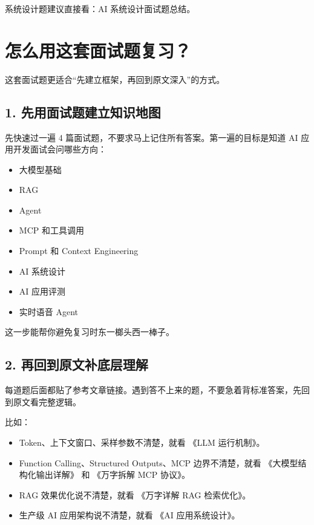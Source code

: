 \documentclass[9pt,a4paper,twocolumn]{ctexart}
\begin{document}
系统设计题建议直接看：AI 系统设计面试题总结。



\section*{怎么用这套面试题复习？}


这套面试题更适合“先建立框架，再回到原文深入”的方式。



\subsection*{1. 先用面试题建立知识地图}


先快速过一遍 4 篇面试题，不要求马上记住所有答案。第一遍的目标是知道 AI 应用开发面试会问哪些方向：


\begin{itemize}[itemsep=1pt, topsep=2pt]
  \item 大模型基础
  \item RAG
  \item Agent
  \item MCP 和工具调用
  \item Prompt 和 Context Engineering
  \item AI 系统设计
  \item AI 应用评测
  \item 实时语音 Agent
\end{itemize}


这一步能帮你避免复习时东一榔头西一棒子。



\subsection*{2. 再回到原文补底层理解}


每道题后面都贴了参考文章链接。遇到答不上来的题，不要急着背标准答案，先回到原文看完整逻辑。



比如：


\begin{itemize}[itemsep=1pt, topsep=2pt]
  \item Token、上下文窗口、采样参数不清楚，就看 《LLM 运行机制》。
  \item Function Calling、Structured Outputs、MCP 边界不清楚，就看 《大模型结构化输出详解》 和 《万字拆解 MCP 协议》。
  \item RAG 效果优化说不清楚，就看 《万字详解 RAG 检索优化》。
  \item 生产级 AI 应用架构说不清楚，就看 《AI 应用系统设计》。
\end{itemize}
\end{document}
